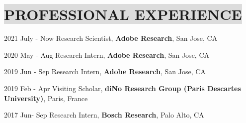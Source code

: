 \section*{
    \colorbox{gainsboro}{PROFESSIONAL EXPERIENCE}
}

2021 July - Now \hspace{9mm} 
Research Scientist, \textbf{Adobe Research},  San Jose, CA

2020 May - Aug \hspace{9mm} 
Research Intern, \textbf{Adobe Research},  San Jose, CA

2019 Jun - Sep \hspace{10mm} 
Research Intern, \textbf{Adobe Research},  San Jose, CA

2019 Feb - Apr \hspace{10mm} 
Visiting Scholar, \textbf{diNo Research Group (Paris Descartes University)}, Paris, France

2017 Jun- Sep \hspace{10mm} 
Research Intern, \textbf{Bosch Research}, Palo Alto, CA

